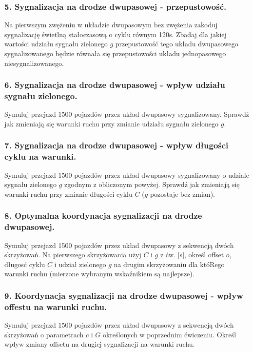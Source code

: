 \documentclass[11pt,a4paper]{article}
\begin{document}
\subsubsection*{5. Sygnalizacja na drodze dwupasowej - przepustowość.}\label{s}
Na pierwszym zwężeniu w układzie dwupasowym bez zwężenia zakoduj sygnalizację świetlną stałoczasową o cyklu równym 120s. Zbadaj dla jakiej wartości udziału sygnału zielonego $g$ przepustowość tego układu dwupasowego sygnalizowanego będzie równała się przepustowości układu jednopasowego niesygnalizowanego.

\subsubsection*{6. Sygnalizacja na drodze dwupasowej - wpływ udziału sygnału zielonego.}
Symuluj przejazd 1500 pojazdów przez układ dwupasowy sygnalizowany. Sprawdź jak zmieniają się warunki ruchu przy zmianie udziału sygnału zielonego $g$.

\subsubsection*{7. Sygnalizacja na drodze dwupasowej - wpływ długości cyklu na warunki.}
Symuluj przejazd 1500 pojazdów przez układ dwupasowy sygnalizowany o udziale sygnału zielonego $g$ zgodnym z obliczonym powyżej. Sprawdź jak zmieniają się warunki ruchu przy zmianie długości cyklu $C$ ($g$ pozostaje bez zmian).

\subsubsection*{8. Optymalna koordynacja sygnalizacji na drodze dwupasowej.}
Symuluj przejazd 1500 pojazdów przez układ dwupasowy z sekwencją dwóch skrzyżowań. Na pierwszego skrzyżowania użyj $C$ i $g$ z ćw. \ref{s}, określ offset $o$, długosć cyklu $C$ i udział zielonego $g$ na drugim skrzyżowaniu dla któRego warunki ruchu (mierzone wybranym wskaźnikiem są najlepsze).

\subsubsection*{9. Koordynacja sygnalizacji na drodze dwupasowej - wpływ offestu na warunki ruchu.}
Symuluj przejazd 1500 pojazdów przez układ dwupasowy z sekwencją dwóch skrzyżowań o parametrach $c$ i $G$ określonych w poprzednim ćwiczeniu. Określ wpływ zmiany offsetu na drugiej sygnalizacji na warunki ruchu. 
\end{document}
